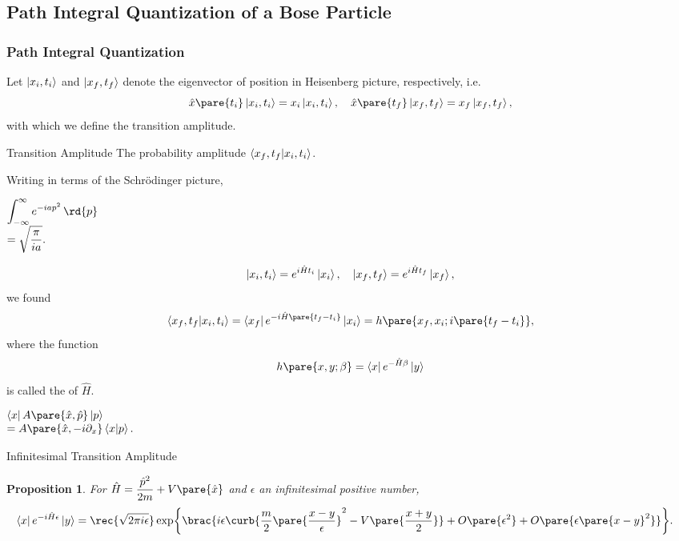 \documentclass[hidelinks]{article}
\newtheorem{proposition}{Proposition}
\begin{document}

\subsection{Path Integral Quantization of a Bose Particle} %
\label{sub:path_integral_quantization_of_a_bose_particle}

\subsubsection{Path Integral Quantization} %
\label{ssub:path_integral_quantization}

Let $\ket{x_i,t_i}$ and $\ket{x_f,t_f}$ denote the eigenvector of position in Heisenberg picture, respectively, i.e.
\[ \hat x\pare{t_i}\ket{x_i,t_i} = x_i\ket{x_i,t_i},\quad \hat x\pare{t_f}\ket{x_f,t_f} = x_f\ket{x_f,t_f}, \]
with which we define the transition amplitude.
\begin{termdef}{Transition Amplitude}
    The probability amplitude $\bra{x_f,t_f}\ket{x_i,t_i}$.
\end{termdef}
Writing in terms of the Schr\"odinger picture,\begin{margintips}
    $\begin{array}{@{}l}
        \displaystyle \int_{-\infty}^\infty e^{-iap^2}\,\rd{p}\\
        \displaystyle  = \sqrt{\frac{\pi}{ia}}.
    \end{array}$
\end{margintips}
\[ \ket{x_i,t_i} = e^{i\hat H t_i}\ket{x_i},\quad \ket{x_f,t_f} = e^{i\hat H t_f}\ket{x_f}, \]
we found
\[ \bra{x_f,t_f}\ket{x_i,t_i} = \bra{x_f}e^{-i\hat H\pare{t_f - t_i}}\ket{x_i} = h\pare{x_f,x_i;i\pare{t_f - t_i}}, \]
where the function
\[ h\pare{x,y;\beta} = \bra{x}e^{-\hat H\beta}\ket{y} \]
is called the  of $\hat H$.\begin{margintips}[2\baselineskip]
    $\begin{array}{@{}l}
        \bra{x}A\pare{\hat x,\hat p}\ket{p}\\
        = A\pare{\hat x,-i\partial_x}\bra{x}\ket{p}.
    \end{array}$
\end{margintips}
\begin{finaleq}{Infinitesimal Transition Amplitude}
    \begin{proposition}
        For $\displaystyle \hat H = \frac{\hat p^2}{2m} + V\pare{\hat x}$ and $\epsilon$ an infinitesimal positive number,
        \begin{align*}
            \bra{x}e^{-i\hat H\epsilon}\ket{y} &= \rec{\sqrt{2\pi i\epsilon}}\exp\brac{i\epsilon\curb{\frac{m}{2} \pare{\frac{{x-y}}{\epsilon}}^2 - V\pare{\frac{x+y}{2}}} + O\pare{\epsilon^2} + O\pare{\epsilon\pare{x-y}^2}}.
        \end{align*}
    \end{proposition}
\end{finaleq}
\end{document}
